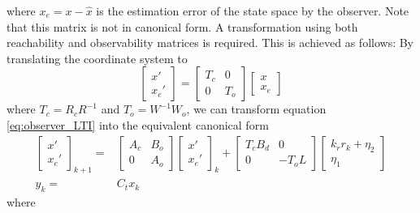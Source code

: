 \documentclass[sigconf]{llncs}
\newcommand{\mat}[1]{{#1}}
\renewcommand{\vec}[1]{{#1}}
\begin{document}
where $\vec{x}_e=\vec{x}-\hat{\vec{x}}$ is the estimation error of the state space by the observer.
Note that this matrix is not in canonical form. A transformation using both reachability and observability matrices is required. This is achieved as follows:
By translating the coordinate system to 
\begin{equation}
\left[\begin{array}{c}\vec{x}'\\ \vec{x}_e'\end{array}\right]=
\left[\begin{array}{cc}\mat{T}_c & \mat{0}\\\mat{0} & \mat{T}_o\end{array}\right]
\left[\begin{array}{c}\vec{x}\\ \vec{x}_e\end{array}\right]
\end{equation}
where $\mat{T}_c=\mat{R}_{c}\mat{R}^{-1}$ and $\mat{T}_o=\mat{W}^{-1}\mat{W}_{o}$, we can transform equation \eqref{eq:observer_LTI} into the equivalent canonical form
\begin{align}
\left [\begin{array}{c}\vec{x}'\\ \vec{x}_e' \end{array}\right]_{k+1}
=& \left [\begin{array}{cc}\mat{A}_{c}&\mat{B}_{o}\\ \mat{0}&\mat{A}_{o}\end{array}\right]
\left [\begin{array}{c}\vec{x}'\\ \vec{x}_e' \end{array}\right]_k
+\left[\begin{array}{cc}\mat{T}_c\mat{B}_d&\mat{0}\\\mat{0}&-\mat{T}_o\mat{L}\end{array}\right]\left [\begin{array}{c}\mat{k}_r\vec{r}_k+\vec{\eta}_2\\ \vec{\eta}_1\end{array}\right]\nonumber\\
\vec{y}_k
=& \mat{C}_{t}\vec{x}_k%
\label{eq:observer_LTI_cf}
\end{align}
where
\end{document}

